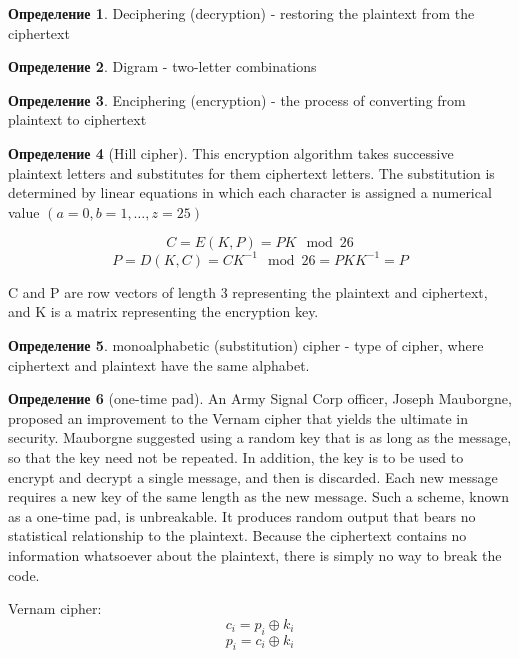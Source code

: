 \documentclass[a4paper]{article}
\theoremstyle{definition}
\newtheorem*{definition}{Определение}
\theoremstyle{remark}
\begin{document}
\begin{definition}
    Deciphering (decryption) - restoring the plaintext from the ciphertext
\end{definition}

\begin{definition}
    Digram - two-letter combinations
\end{definition}

\begin{definition}
    Enciphering (encryption) - the process of converting
from plaintext to ciphertext
\end{definition}

\begin{definition}[Hill cipher]

    This encryption algorithm takes successive plaintext letters
and substitutes for them ciphertext letters. The substitution is determined by 
linear equations in which each character is assigned a numerical value $(a = 0, b = 1, \dots, z = 25)$

$$C = E(K, P) = PK \mod 26$$
$$P = D(K, C) = CK^{-1} \mod 26 = P K K^{-1} = P$$

C and P are row vectors of length 3 representing the plaintext and ciphertext,
and K is a matrix representing the encryption key.
\end{definition}

\begin{definition}
    monoalphabetic (substitution) cipher - type of cipher, where ciphertext and plaintext have
    the same alphabet.
\end{definition}
\begin{definition}[one-time pad]
    An Army Signal Corp officer, Joseph Mauborgne, proposed an improvement to the
Vernam cipher that yields the ultimate in security. Mauborgne suggested using a
random key that is as long as the message, so that the key need not be repeated. In
addition, the key is to be used to encrypt and decrypt a single message, and then is
discarded. Each new message requires a new key of the same length as the new message. 
Such a scheme, known as a one-time pad, is unbreakable. It produces random
output that bears no statistical relationship to the plaintext. Because the ciphertext
contains no information whatsoever about the plaintext, there is simply no way to
break the code.

Vernam cipher:
$$c_i = p_i \oplus k_i$$
$$p_i = c_i \oplus k_i$$
\end{definition}
\end{document}
